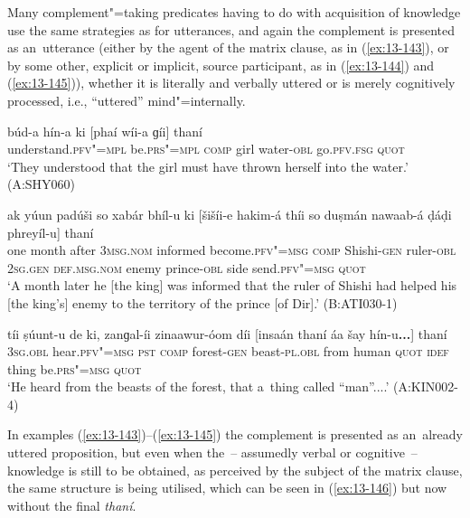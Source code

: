  Many complement"=taking predicates having to do with acquisition of knowledge use the same strategies as for utterances, and again the complement is presented as an~utterance (either by the agent of the matrix clause, as in (\ref{ex:13-143}), or by some other, explicit or implicit, source participant, as in (\ref{ex:13-144}) and (\ref{ex:13-145})), whether it is literally and verbally uttered or is merely cognitively processed, i.e., ``uttered'' mind"=internally. 

\begin{exe}
\ex
\label{ex:13-143}
\gll \label{bkm:Ref190835538}búd-a hín-a ki [phaí wíi-a  ɡíi] thaní \\
understand.\textsc{pfv"=mpl} be.\textsc{prs"=mpl} \textsc{comp} girl water-\textsc{obl} go.\textsc{pfv.fsg} \textsc{quot} \\
\glt `They understood that the girl must have thrown herself into the water.' (A:SHY060)

\ex
\label{ex:13-144}
\gll ak yúun padúši so xabár bhíl-u  ki [šišíi-e hakim-á thíi so
  duṣmán nawaab-á  ḍáḍi phreyíl-u] thaní \\
one month after \textsc{3msg.nom} informed become.\textsc{pfv"=msg}  \textsc{comp} Shishi-\textsc{gen} ruler-\textsc{obl } \textsc{2sg.gen} \textsc{def.msg.nom} enemy prince-\textsc{obl} side send.\textsc{pfv"=msg} \textsc{quot}  \\
\glt `A month later he [the king] was informed that the ruler of Shishi had helped his [the king's] enemy to the territory of the prince [of Dir].' (B:ATI030-1)

\ex
\label{ex:13-145}
\gll \label{bkm:Ref190835565}tíi ṣúunt-u de ki, zanɡal-íi zinaawur-óom  díi [insaán thaní áa šay hín-u\textbf{...}] thaní \\
\textsc{3sg.obl} hear.\textsc{pfv"=msg} \textsc{pst} \textsc{comp} forest-\textsc{gen} beast-\textsc{pl.obl}  from human \textsc{quot} \textsc{idef} thing be.\textsc{prs"=msg} \textsc{quot} \\
\glt `He heard from the beasts of the forest, that a~thing called ``man''....' (A:KIN002-4) 
\end{exe}

In examples (\ref{ex:13-143})--(\ref{ex:13-145}) the complement is presented as an~already uttered proposition, but even when the~-- assumedly verbal or cognitive~-- knowledge is still to be obtained, as perceived by the subject of the matrix clause, the same structure is being utilised, which can be seen in (\ref{ex:13-146}) but now without the final \textit{thaní}. 

